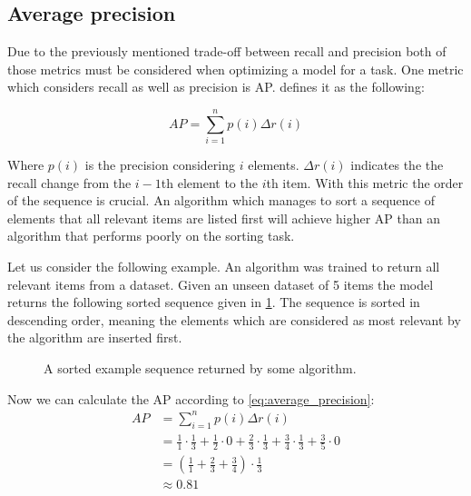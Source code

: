 \subsection{Average precision}
\label{chp:fundamentals:sec:metrics:subsec:average_precision}

Due to the previously mentioned trade-off between recall and precision both of those metrics must be considered when optimizing a model for a task.
One metric which considers recall as well as precision is \ac{AP}.
\Textcite{Zhu:2004} defines it as the following:

\begin{equation}\label{eq:average_precision}
    AP = \sum_{i=1}^n {p(i)\Delta r(i)}
\end{equation}

Where $p(i)$ is the precision considering $i$ elements.
$\Delta r(i)$ indicates the the recall change from the $i-1$th element to the $i$th item.
With this metric the order of the sequence is crucial.
An algorithm which manages to sort a sequence of elements that all relevant items are listed first will achieve higher AP than an algorithm that performs poorly on the sorting task.

Let us consider the following example.
An algorithm was trained to return all relevant items from a dataset.
Given an unseen dataset of 5 items the model returns the following sorted sequence given in \cref{fig:metrics:average_precision:sample}.
The sequence is sorted in descending order, meaning the elements which are considered as most relevant by the algorithm are inserted first.

\begin{figure}[htpb]
    \centering
    \def\svgwidth{\columnwidth}
    
    \caption[Example Sequence]{A sorted example sequence returned by some algorithm.}\label{fig:metrics:average_precision:sample}
\end{figure}

Now we can calculate the \ac{AP} according to \cref{eq:average_precision}:
\begin{equation}
    \begin{aligned}
        AP &= \sum_{i=1}^n {p(i)\Delta r(i)}\\
        &= \frac{1}{1} \cdot \frac{1}{3} + \frac{1}{2} \cdot 0 + \frac{2}{3} \cdot \frac{1}{3} + \frac{3}{4} \cdot \frac{1}{3} + \frac{3}{5} \cdot 0\\
        &=  (\frac{1}{1} + \frac{2}{3}  + \frac{3}{4}) \cdot \frac{1}{3}\\
        &\approx 0.81
    \end{aligned}
\end{equation}
